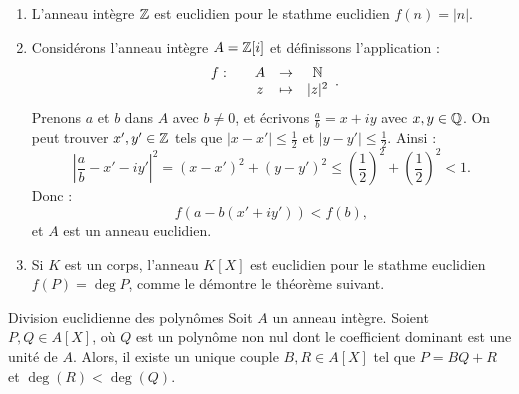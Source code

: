 \documentclass[]{report}
\begin{document}
\begin{ex}{}{}
    \begin{enumerate}
        \item L'anneau intègre $\mathbb{Z}$ est euclidien pour le stathme euclidien $f(n) = |n|$.
        \item Considérons l'anneau intègre $A = \mathbb{Z}[i]$ et définissons l'application :
        \[\begin{array}{ccccc} f : & & A & \to & \mathbb{N} \\ & & z & \mapsto & |z|^2 \end{array}.\]
        Prenons $a$ et $b$ dans $A$ avec $b \neq 0$, et écrivons $\frac{a}{b} = x + iy$ avec $x, y \in \mathbb{Q}$. On peut trouver $x', y' \in \mathbb{Z}$ tels que $|x - x'| \le \frac{1}{2}$ et $|y - y'| \le \frac{1}{2}$. Ainsi :
        \[\left| \frac{a}{b} - x' - iy' \right|^2 = (x - x')^2 + (y - y')^2 \le \left(\frac{1}{2}\right)^2 + \left(\frac{1}{2}\right)^2 < 1.\]
        Donc :
        \[f(a - b(x' + iy')) < f(b),\]
        et $A$ est un anneau euclidien.
        \item Si $K$ est un corps, l'anneau $K[X]$ est euclidien pour le stathme euclidien $f(P) = \deg P$, comme le démontre le théorème suivant.
    \end{enumerate}
\end{ex}

\begin{tm}{Division euclidienne des polynômes}{}
    Soit $A$ un anneau intègre. Soient $P, Q \in A[X]$, où $Q$ est un polynôme non nul dont le coefficient dominant est une unité de $A$. Alors, il existe un unique couple $B, R \in A[X]$ tel que $P = BQ + R$ et $\deg(R) < \deg(Q)$.
\end{tm}
\end{document}
